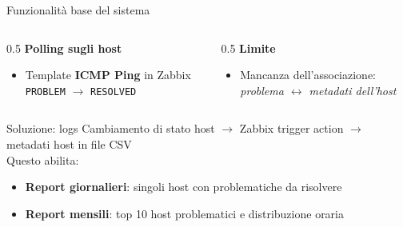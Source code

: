 \documentclass[aspectratio=169]{beamer}
\begin{document}
\begin{frame}{Funzionalità base del sistema}
    \begin{columns}[T]
        \begin{column}[T]{0.5\textwidth}
            \textbf{Polling sugli host}

            \begin{itemize}
                \item Template \textbf{ICMP Ping} in Zabbix\\ \texttt{PROBLEM} $\longrightarrow$ \texttt{RESOLVED}
            \end{itemize}
        \end{column}
        \begin{column}{0.5\textwidth}
            \textbf{Limite}
            \begin{itemize}
                \item Mancanza dell'associazione: \\
                      \textit{problema $\longleftrightarrow$ metadati dell'host}
            \end{itemize}
        \end{column}
    \end{columns}
    \vspace{0.3cm}
    \begin{block}{Soluzione: logs}
        \vspace{0.2cm}
        Cambiamento di stato host $\longrightarrow$ Zabbix trigger action $\longrightarrow$ metadati host in file CSV\\
        \vspace{0.5cm}
        Questo abilita:
        \begin{itemize}
            \item \textbf{Report giornalieri}: singoli host con problematiche da risolvere%
            \item \textbf{Report mensili}: top 10 host problematici e distribuzione oraria%
        \end{itemize}
    \end{block}
\end{frame}
\end{document}
